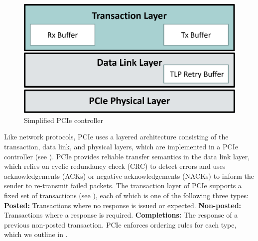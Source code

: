 \begin{figure}[!htb]
    \centering
    \includegraphics[width=\columnwidth]{figures/interconnect-sc/pcie-controller.png}
    \caption{Simplified PCIe controller}
    \label{fig:pcie-controller}
\end{figure}

Like network protocols, PCIe uses a layered architecture consisting of the transaction, data link, and physical layers, which are implemented in a PCIe controller (see ).
PCIe provides reliable transfer semantics in the data link layer, which relies on cyclic redundancy check (CRC) to detect errors and uses acknowledgements (ACKs) or negative acknowledgements (NACKs) to inform the sender to re-transmit failed packets.
The transaction layer of PCIe supports a fixed set of transactions (see ), each of which is one of the following three types:
\textbf{Posted:} Transactions where no response is issued or expected. 
\textbf{Non-posted:} Transactions where a response is required. 
\textbf{Completions:} The response of a previous non-posted transaction.
PCIe enforces ordering rules for each type, which we outline in .

